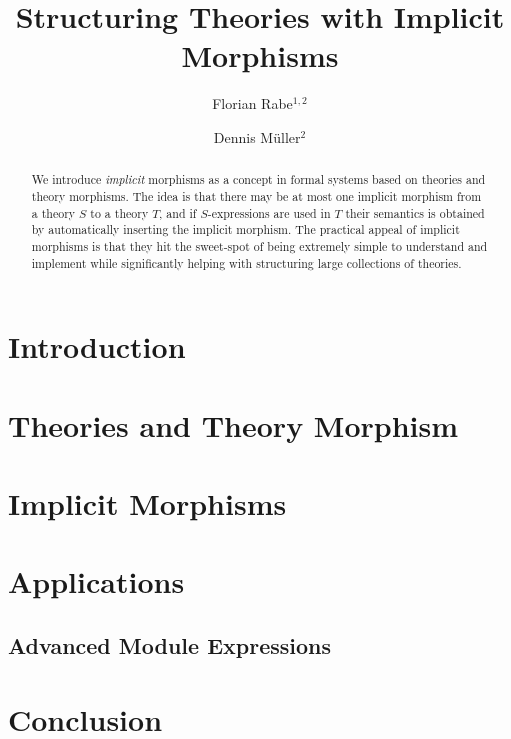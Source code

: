 \documentclass[orivec]{llncs}
\begin{document}
\title{Structuring Theories with Implicit Morphisms}
\author{Florian Rabe$^{1,2}$ \and Dennis M\"uller$^2$}
\maketitle

\begin{abstract}
We introduce \emph{implicit} morphisms as a concept in formal systems based on theories and theory morphisms.
The idea is that there may be at most one implicit morphism from a theory $S$ to a theory $T$, and if $S$-expressions are used in $T$ their semantics is obtained by automatically inserting the implicit morphism.
The practical appeal of implicit morphisms is that they hit the sweet-spot of being extremely simple to understand and implement while significantly helping with structuring large collections of theories.
\end{abstract}


\section{Introduction}


\section{Theories and Theory Morphism}\label{sec:mmt}


%

\section{Implicit Morphisms}


\section{Applications}


\begin{modexp}
\section{Advanced Module Expressions}\label{sec:complex}

\end{modexp}

\section{Conclusion}





\end{document}
